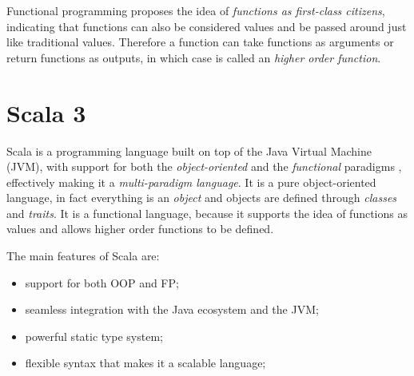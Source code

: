 Functional programming proposes the idea of \textit{functions as first-class citizens}, indicating that functions can also be considered values and be passed around just like traditional values.
%
Therefore a function can take functions as arguments or return functions as outputs, in which case is called an \textit{higher order function}.


\section{Scala 3}

Scala is a programming language built on top of the Java Virtual Machine (JVM), with support for both the \textit{object-oriented} and the \textit{functional} paradigms \cite{scala-lang-spec}, effectively making it a \textit{multi-paradigm language}.
%
It is a pure object-oriented language, in fact everything is an \textit{object} and objects are defined through \textit{classes} and \textit{traits}.
%
It is a functional language, because it supports the idea of functions as values and allows higher order functions to be defined.

The main features of Scala are:
%
\begin{itemize}
    \item support for both OOP and FP;
    \item seamless integration with the Java ecosystem and the JVM;
    \item powerful static type system;
    \item flexible syntax that makes it a scalable language;
\end{itemize}

